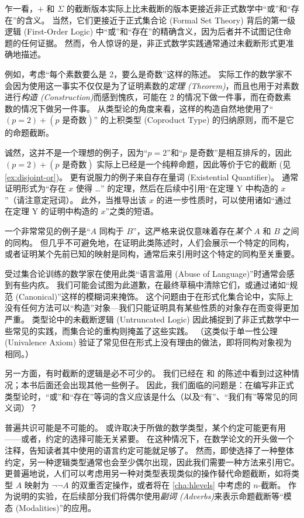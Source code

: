 %
%
%

乍一看，$+$ 和 $\Sigma$ 的截断版本实际上比未截断的版本更接近非正式数学中“或”和“存在”的含义。
当然，它们更接近于正式集合论 (Formal Set Theory) 背后的第一级逻辑 (First-Order Logic) 中“或”和“存在”的精确含义，因为后者并不试图记住命题的任何证据。
然而，令人惊讶的是，非正式数学实践通常通过未截断形式更准确地描述。

%
例如，考虑“每个素数要么是 2，要么是奇数”这样的陈述。
实际工作的数学家不会因为使用这一事实不仅仅是为了证明素数的\emph{定理 (Theorem)}，而且也用于对素数进行\emph{构造 (Construction)}而感到愧疚，可能在 2 的情况下做一件事，而在奇数素数的情况下做另一件事。
从类型论的角度来看，这样的构造自然地使用了“$(p=2)+(p\text{ 是奇数})$” 的上积类型 (Coproduct Type) 的归纳原则，而不是它的命题截断。

诚然，这并不是一个理想的例子，因为“$p=2$”和“$p$ 是奇数”是相互排斥的，因此 $(p=2)+(p\text{ 是奇数})$ 实际上已经是一个纯粹命题，因此等价于它的截断 (见 \cref{ex:disjoint-or})。
更有说服力的例子来自存在量词 (Existential Quantifier)。
通常证明形式为“存在 $x$ 使得 \dots” 的定理，然后在后续中引用“在定理 Y 中构造的 $x$”（请注意定冠词）。
此外，当推导出该 $x$ 的进一步性质时，可以使用诸如“通过在定理 Y 的证明中构造的 $x$”之类的短语。

一个非常常见的例子是“$A$ 同构于 $B$”，这严格来说仅意味着存在\emph{某个} $A$ 和 $B$ 之间的同构。
但几乎不可避免地，在证明此类陈述时，人们会展示一个特定的同构，或者证明某个先前已知的映射是同构，通常后来引用时这个特定的同构至关重要。

受过集合论训练的数学家在使用此类“语言滥用 (Abuse of Language)”时通常会感到有些内疚。
我们可能会试图为此道歉，在最终草稿中清除它们，或通过诸如“规范 (Canonical)”这样的模糊词来掩饰。
这个问题由于在形式化集合论中，实际上没有任何方法可以“构造”对象---我们只能证明具有某些性质的对象存在而变得更加严重。
类型论中的未截断逻辑 (Untruncated Logic) 因此捕捉到了非正式数学中一些常见的实践，而集合论的重构则掩盖了这些实践。
（这类似于单一性公理 (Univalence Axiom) 验证了常见但在形式上没有理由的做法，即将同构对象视为相同。）

另一方面，有时截断的逻辑是必不可少的。
我们已经在 \LEM{} 和 \choice{} 的陈述中看到过这种情况；本书后面还会出现其他一些例子。
因此，我们面临的问题是：在编写非正式类型论时，“或”和“存在”等词的含义应该是什么（以及“有”、“我们有”等常见的同义词）？

普遍共识可能是不可能的。
或许取决于所做的数学类型，某个约定可能更有用——或者，约定的选择可能无关紧要。
在这种情况下，在数学论文的开头做一个注释，告知读者其中使用的语言约定可能就足够了。
然而，即使选择了一种整体约定，另一种逻辑类型通常也会至少偶尔出现，因此我们需要一种方法来引用它。
更普遍地说，人们可以考虑用另一种对类型表现类似的操作替代命题截断，如将类型 $A$ 映射为 $\neg\neg A$ 的双重否定操作，或者将在 \cref{cha:hlevels} 中考虑的 $n$-截断。
作为说明的实验，在后续部分我们将偶尔使用\emph{副词 (Adverbs)}来表示命题截断等“模态 (Modalities)”的应用。

